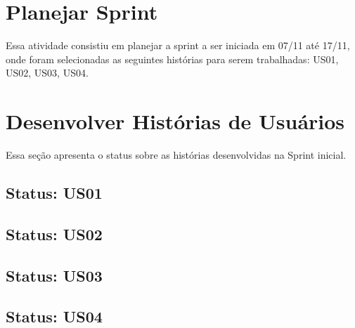 \section{Planejar Sprint}
Essa atividade consistiu em planejar a sprint a ser iniciada em 07/11 até 17/11, onde foram selecionadas as seguintes histórias para serem trabalhadas: US01, US02, US03, US04.

\section{Desenvolver Histórias de Usuários}
Essa seção apresenta o status sobre as histórias desenvolvidas na Sprint inicial.

\subsection{Status: US01}

\subsection{Status: US02}

\subsection{Status: US03}

\subsection{Status: US04}
